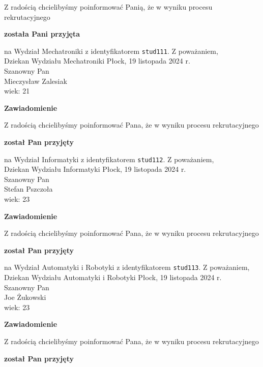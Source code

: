 \documentclass[12pt,a4paper]{article}
\begin{document}
\bigskip 
Z radością chcielibyśmy poinformować Panią, że w wyniku procesu rekrutacyjnego
\begin{center}
\textsf{\textbf{została Pani przyjęta}}
\end{center}
na Wydział Mechatroniki z identyfikatorem \verb|stud111|. 
\vspace{2cm}
\noindent
Z poważaniem, \\
Dziekan
Wydziału Mechatroniki
\newpage
\hfill Płock, 19 listopada 2024 r. \\
\noindent
Szanowny Pan \\
Mieczysław Zalesiak \\
wiek: 21
\bigskip
\begin{center}
    {\Large\textbf{Zawiadomienie}}
\end{center}
\bigskip 
Z radością chcielibyśmy poinformować Pana, że w wyniku procesu rekrutacyjnego
\begin{center}
\textsf{\textbf{został Pan przyjęty}}
\end{center}
na Wydział Informatyki z identyfikatorem \verb|stud112|. 
\vspace{2cm}
\noindent
Z poważaniem, \\
Dziekan
Wydziału Informatyki
\newpage
\hfill Płock, 19 listopada 2024 r. \\
\noindent
Szanowny Pan \\
Stefan Pszczoła \\
wiek: 23
\bigskip
\begin{center}
    {\Large\textbf{Zawiadomienie}}
\end{center}
\bigskip 
Z radością chcielibyśmy poinformować Pana, że w wyniku procesu rekrutacyjnego
\begin{center}
\textsf{\textbf{został Pan przyjęty}}
\end{center}
na Wydział Automatyki i Robotyki z identyfikatorem \verb|stud113|. 
\vspace{2cm}
\noindent
Z poważaniem, \\
Dziekan
Wydziału Automatyki i Robotyki
\newpage
\hfill Płock, 19 listopada 2024 r. \\
\noindent
Szanowny Pan \\
Joe Żukowski \\
wiek: 23
\bigskip
\begin{center}
    {\Large\textbf{Zawiadomienie}}
\end{center}
\bigskip 
Z radością chcielibyśmy poinformować Pana, że w wyniku procesu rekrutacyjnego
\begin{center}
\textsf{\textbf{został Pan przyjęty}}
\end{center}
\end{document}
